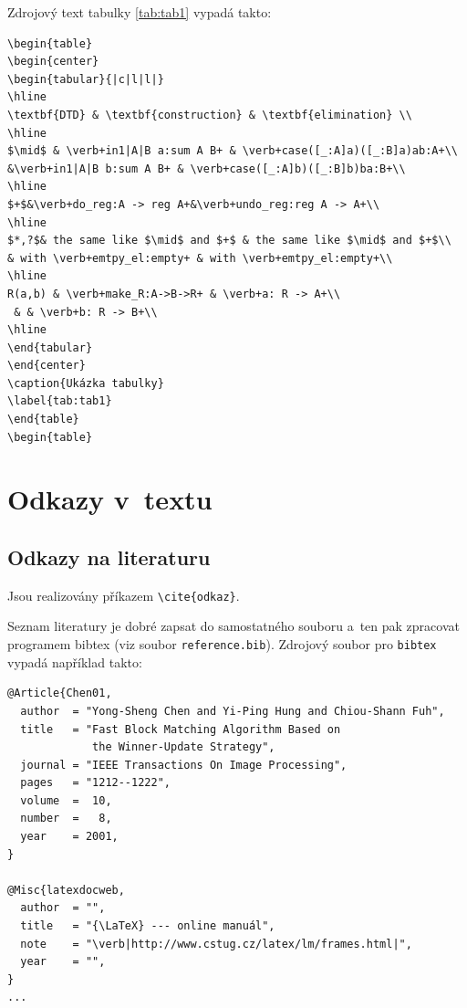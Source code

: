 \documentclass[11pt,twoside,a4paper]{book}
\begin{document}
Zdrojový text tabulky \ref{tab:tab1} vypadá takto:
\begin{verbatim}
\begin{table}
\begin{center}
\begin{tabular}{|c|l|l|}
\hline
\textbf{DTD} & \textbf{construction} & \textbf{elimination} \\
\hline
$\mid$ & \verb+in1|A|B a:sum A B+ & \verb+case([_:A]a)([_:B]a)ab:A+\\
&\verb+in1|A|B b:sum A B+ & \verb+case([_:A]b)([_:B]b)ba:B+\\
\hline
$+$&\verb+do_reg:A -> reg A+&\verb+undo_reg:reg A -> A+\\
\hline
$*,?$& the same like $\mid$ and $+$ & the same like $\mid$ and $+$\\
& with \verb+emtpy_el:empty+ & with \verb+emtpy_el:empty+\\
\hline
R(a,b) & \verb+make_R:A->B->R+ & \verb+a: R -> A+\\
 & & \verb+b: R -> B+\\
\hline
\end{tabular}
\end{center}
\caption{Ukázka tabulky}
\label{tab:tab1}
\end{table}
\begin{table}
\end{verbatim}

\section{Odkazy v~textu}
\subsection{Odkazy na literaturu}
Jsou realizovány příkazem \verb|\cite{odkaz}|. 

Seznam literatury je dobré zapsat do samostatného souboru a~ten pak zpracovat programem bibtex (viz soubor
\verb|reference.bib|). Zdrojový soubor pro \verb|bibtex| vypadá například takto:
\begin{verbatim}
@Article{Chen01,
  author  = "Yong-Sheng Chen and Yi-Ping Hung and Chiou-Shann Fuh",
  title   = "Fast Block Matching Algorithm Based on 
             the Winner-Update Strategy",
  journal = "IEEE Transactions On Image Processing",
  pages   = "1212--1222",
  volume  =  10,
  number  =   8,
  year    = 2001,
}

@Misc{latexdocweb,
  author  = "",
  title   = "{\LaTeX} --- online manuál",
  note    = "\verb|http://www.cstug.cz/latex/lm/frames.html|",
  year    = "",
}
...
\end{verbatim}
\end{document}
